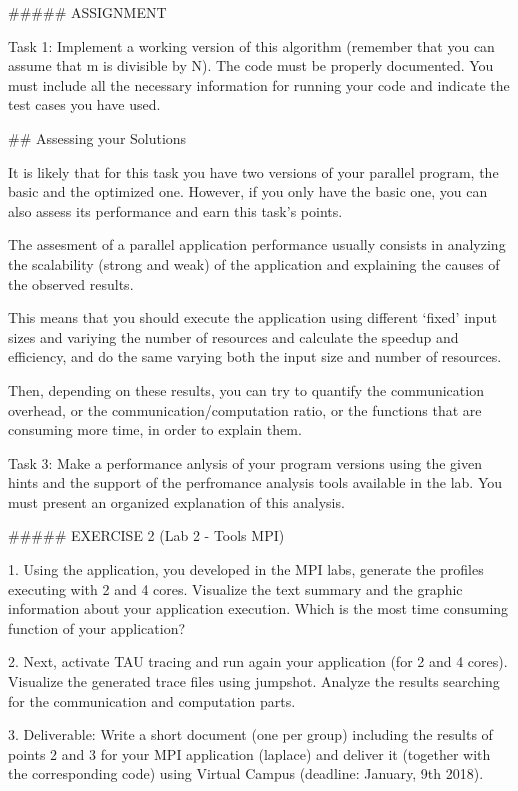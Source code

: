 ##### ASSIGNMENT

Task 1: Implement a working version of this algorithm (remember that you can assume that m is divisible by N). The code must be properly documented. You must include all the necessary information for running your code and indicate the test cases you have used.

## Assessing your Solutions

It is likely that for this task you have two versions of your parallel program, the basic and the optimized one. However, if you
only have the basic one, you can also assess its performance and earn this task’s points.

The assesment of a parallel application performance usually consists in analyzing the scalability (strong and weak) of the application and explaining the causes of the observed results.

This means that you should execute the application using different ‘fixed’ input sizes and variying the number of resources and calculate the speedup and efficiency, and do the same varying both the input size and number of resources.

Then, depending on these results, you can try to quantify the communication overhead, or the communication/computation
ratio, or the functions that are consuming more time, in order to explain them.

Task 3: Make a performance anlysis of your program versions using the given hints and the support of the perfromance
analysis tools available in the lab. You must present an organized explanation of this analysis.


##### EXERCISE 2 (Lab 2 - Tools MPI)

1. Using the application, you developed in the MPI labs, generate the profiles executing with 2 and 4 cores. Visualize the text summary and the graphic information about your application execution. Which is the most time consuming function of your application?

2. Next, activate TAU tracing and run again your application (for 2 and 4 cores). Visualize the generated trace files using jumpshot. Analyze the results searching for the communication and computation parts.

3. Deliverable: Write a short document (one per group) including the results of points 2 and 3 for your MPI application (laplace) and deliver it (together with the corresponding code) using Virtual Campus (deadline: January, 9th 2018).

